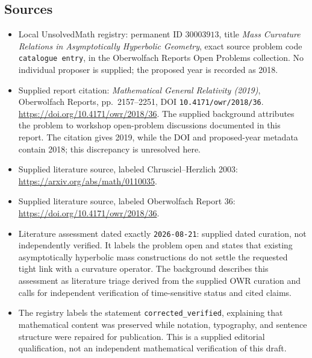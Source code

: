 \documentclass[11pt]{article}
\begin{document}
\subsection{Sources}
\begin{itemize}
\item Local UnsolvedMath registry: permanent ID \(30003913\), title \emph{Mass Curvature Relations in Asymptotically Hyperbolic Geometry}, exact source problem code \texttt{catalogue entry}, in the Oberwolfach Reports Open Problems collection. No individual proposer is supplied; the proposed year is recorded as 2018.
\item Supplied report citation: \emph{Mathematical General Relativity (2019)}, Oberwolfach Reports, pp.~2157--2251, DOI \texttt{10.4171/owr/2018/36}. \url{https://doi.org/10.4171/owr/2018/36}. The supplied background attributes the problem to workshop open-problem discussions documented in this report. The citation gives 2019, while the DOI and proposed-year metadata contain 2018; this discrepancy is unresolved here.
\item Supplied literature source, labeled Chrusciel--Herzlich 2003: \url{https://arxiv.org/abs/math/0110035}.
\item Supplied literature source, labeled Oberwolfach Report 36: \url{https://doi.org/10.4171/owr/2018/36}.
\item Literature assessment dated exactly \texttt{2026-08-21}: supplied dated curation, not independently verified. It labels the problem open and states that existing asymptotically hyperbolic mass constructions do not settle the requested tight link with a curvature operator. The background describes this assessment as literature triage derived from the supplied OWR curation and calls for independent verification of time-sensitive status and cited claims.
\item The registry labels the statement \texttt{corrected\_verified}, explaining that mathematical content was preserved while notation, typography, and sentence structure were repaired for publication. This is a supplied editorial qualification, not an independent mathematical verification of this draft.
\end{itemize}
\end{document}
